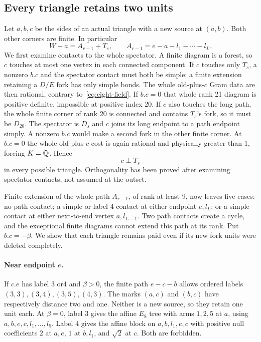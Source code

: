\subsection{Every triangle retains two units}\label{app:eight-triangles}
Let $a,b,c$ be the sides of an actual triangle with a new source at
$(a,b)$. Both other corners are finite. In particular
\[
 W+a=A_{r-1}+T_s,\qquad A_{r-1}=e-a-l_1-\cdots-l_L.
\]
We first examine contacts to the whole spectator. A finite diagram is
a forest, so $c$ touches at most one vertex in each connected component.
If $c$ touches only $T_s$, a nonzero $b.c$ and the spectator contact
must both be simple: a finite extension retaining a $D/E$ fork has only
simple bonds. The whole old-plus-$c$ Gram data are then rational,
contrary to~\eqref{eq:eight-field}. If $b.c=0$ that whole rank 21
diagram is positive definite, impossible at positive index 20.
If $c$ also touches the long path, the whole finite corner of rank 20
is connected and contains $T_s$'s fork, so it must be $D_{20}$.
The spectator is $D_s$ and $c$ joins its long endpoint to a path
endpoint simply. A nonzero $b.c$ would make a second fork in the
other finite corner. At $b.c=0$ the whole old-plus-$c$ cost is again
rational and physically greater than 1, forcing $K=\mathbb Q$. Hence
\begin{equation}\label{eq:eight-triangle-seal}
 c\perp T_s
\end{equation}
in every possible triangle. Orthogonality has been proved after
examining spectator contacts, not assumed at the outset.

Finite extension of the whole path $A_{r-1}$, of rank at least 9,
now leaves five cases: no path contact; a simple or label 4 contact at
either endpoint $e,l_L$; or a simple contact at either next-to-end
vertex $a,l_{L-1}$. Two path contacts create a cycle, and the
exceptional finite diagrams cannot extend this path at its rank.
Put $b.c=-\beta$. We show that each triangle remains paid even
if its new fork units were deleted completely.

\paragraph{Near endpoint $e$.}
If $c.e$ has label 3 or4 and $\beta>0$, the finite path $e-c-b$
allows ordered labels $(3,3),(3,4),(3,5),(4,3)$. The marks $(a,c)$
and $(b,c)$ have respectively distance two and one. Neither is a new
source, so they retain one unit each. At $\beta=0$, label 3 gives
the affine $E_8$ tree with arms $1,2,5$ at $a$, using
$a,b,e,c,l_1,\ldots,l_5$. Label 4 gives the affine block on
$a,b,l_1,e,c$ with positive null coefficients $2$ at $a,e$,
$1$ at $b,l_1$, and $\sqrt2$ at $c$. Both are forbidden.

